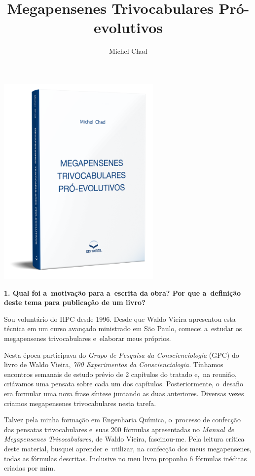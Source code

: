 \documentclass{gescons}
\author{Michel Chad}
\title{Megapensenes Trivocabulares Pró-evolutivos}
\begin{document}
    \makeentrevistatitle

    \begin{multicols}{2}



\begin{center}
    \includegraphics[width=8cm]{articles/entrevista/mockups/Michel-Chad}
\end{center}

\textbf{1.       Qual foi a~motivação para a~escrita da obra? Por que a~definição deste tema para publicação de um livro?}

Sou voluntário do IIPC desde 1996. Desde que Waldo Vieira apresentou esta técnica em um curso avançado ministrado em São Paulo, comecei a~estudar os megapensenes trivocabulares e~elaborar meus próprios. 

Nesta época participava do \textit{Grupo de Pesquisa da Conscienciologia} (GPC) do livro de Waldo Vieira,  \textit{700 Experimentos da Conscienciologia.} Tínhamos encontros semanais de estudo prévio de 2 capítulos do tratado e,~na reunião, criávamos uma pensata sobre cada um dos capítulos. Posteriormente, o~desafio era formular uma nova frase síntese juntando as duas anteriores. Diversas vezes criamos megapensenes trivocabulares nesta tarefa. 

Talvez pela minha formação em Engenharia Química, o~processo de confecção das pensatas trivocabulares e~suas 200 fórmulas apresentadas no
\textit{Manual de Megapensenes Trivocabulares,} de Waldo Vieira,  fascinou-me. Pela leitura crítica deste material, busquei aprender e~utilizar, na confecção dos meus megapensenes, todas as fórmulas descritas. Inclusive no meu livro proponho 6 fórmulas inéditas criadas por mim.


\end{multicols}
\end{document}
